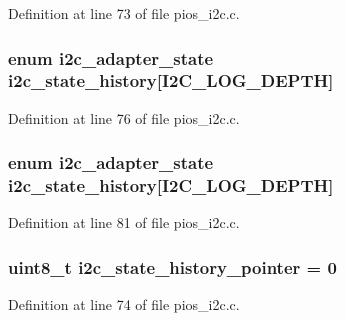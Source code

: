 Definition at line 73 of file pios\-\_\-i2c.\-c.

\hypertarget{group___p_i_o_s___i2_c_ga207839e0ce4c1011c30ea9254657251c}{
\subsubsection[{i2c\-\_\-state\-\_\-history}]{\setlength{\rightskip}{0pt plus 5cm}enum {\bf i2c\-\_\-adapter\-\_\-state} i2c\-\_\-state\-\_\-history\mbox{[}I2\-C\-\_\-\-L\-O\-G\-\_\-\-D\-E\-P\-T\-H\mbox{]}}}\label{group___p_i_o_s___i2_c_ga207839e0ce4c1011c30ea9254657251c}


Definition at line 76 of file pios\-\_\-i2c.\-c.

\hypertarget{group___p_i_o_s___i2_c_ga207839e0ce4c1011c30ea9254657251c}{
\subsubsection[{i2c\-\_\-state\-\_\-history}]{\setlength{\rightskip}{0pt plus 5cm}enum {\bf i2c\-\_\-adapter\-\_\-state} i2c\-\_\-state\-\_\-history\mbox{[}I2\-C\-\_\-\-L\-O\-G\-\_\-\-D\-E\-P\-T\-H\mbox{]}}}\label{group___p_i_o_s___i2_c_ga207839e0ce4c1011c30ea9254657251c}


Definition at line 81 of file pios\-\_\-i2c.\-c.

\hypertarget{group___p_i_o_s___i2_c_gad02d69a4953e925d905e000697a0d885}{
\subsubsection[{i2c\-\_\-state\-\_\-history\-\_\-pointer}]{ {\bf uint8\-\_\-t} i2c\-\_\-state\-\_\-history\-\_\-pointer = 0}}\label{group___p_i_o_s___i2_c_gad02d69a4953e925d905e000697a0d885}


Definition at line 74 of file pios\-\_\-i2c.\-c.

